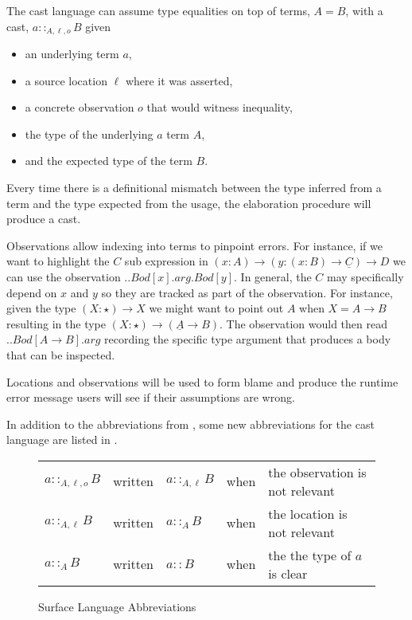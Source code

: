The cast language can assume type equalities on top of terms, $A=B$, with a cast, $a::_{A,\ensuremath{\ell},o}B$ given
\begin{itemize}
\item an underlying term $a$,
\item a source location $\ell$ where it was asserted,
\item a concrete observation $o$ that would witness inequality,
\item the type of the underlying $a$ term $A$,
\item and the expected type of the term $B$.
\end{itemize}
Every time there is a definitional mismatch between the type inferred from a term and the type expected from the usage, the elaboration procedure will produce a cast.
 
Observations allow indexing into terms to pinpoint errors.
For instance, if we want to highlight the $C$ sub expression in $\left(x:A\right)\rightarrow\left(y:\left(x:B\right)\rightarrow\underline{C}\right)\rightarrow D$ we can use the observation $..Bod[x].arg.Bod[y]$.
In general, the $C$ may specifically depend on $x$ and $y$ so they are tracked as part of the observation.
For instance, given the type $\left(X:\star\right)\rightarrow X$ we might want to point out $A$ when $X=A\rightarrow B$ resulting in the type $\left(X:\star\right)\rightarrow\left(\underline{A}\rightarrow B\right)$.
The observation would then read $..Bod[A\rightarrow B].arg$ recording the specific type argument that produces a body that can be inspected.
 
Locations and observations will be used to form blame and produce the runtime error message users will see if their assumptions are wrong.
 
In addition to the abbreviations from , some new abbreviations for the cast language are listed in .
\begin{figure}
\begin{tabular}{lclll}
$a::_{A,\ensuremath{\ell},o}B$ & written & $a::_{A,\ensuremath{\ell}}B$ & when & the observation is not relevant\tabularnewline
$a::_{A,\ensuremath{\ell}}B$ & written & $a::_{A}B$ & when & the location is not relevant\tabularnewline
$a::_{A}B$ & written & $a::B$ & when & the the type of $a$ is clear\tabularnewline
\end{tabular}

\caption{Surface Language Abbreviations}
\label{fig:cast-pre-syntax-abrev}
\end{figure}

